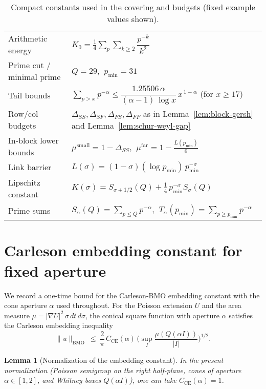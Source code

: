 \documentclass[11pt]{article}
\newtheorem{lemma}[theorem]{Lemma}
\theoremstyle{definition}
\theoremstyle{remark}
\begin{document}
\begin{table}[H]
\centering
\caption{Compact constants used in the covering and budgets (fixed example values shown).}
\begin{tabular}{l l}
\toprule
Arithmetic energy & $K_0=\tfrac14\sum_{p}\sum_{k\ge2} \dfrac{p^{-k}}{k^2}$ \\ 
Prime cut / minimal prime & $Q=29$, $\ p_{\min}=31$ \\ 
Tail bounds & $\sum_{p>x}p^{-\alpha} \le \dfrac{1.25506\,\alpha}{(\alpha-1)\,\log x}\,x^{\,1-\alpha}$ (for $x\ge 17$) \\ 
Row/col budgets & $\Delta_{SS},\Delta_{SF},\Delta_{FS},\Delta_{FF}$ as in Lemma~\ref{lem:block-gersh} and Lemma~\ref{lem:schur-weyl-gap} \\ 
In-block lower bounds & $\mu^{\mathrm{small}}=1-\Delta_{SS}$, $\ \mu^{\mathrm{far}}=1-\tfrac{L(p_{\min})}{6}$ \\ 
Link barrier & $L(\sigma)=(1-\sigma)(\log p_{\min})\,p_{\min}^{-\sigma}$ \\ 
Lipschitz constant & $K(\sigma)=S_{\sigma+1/2}(Q)+\tfrac14\,p_{\min}^{-\sigma}S_{\sigma}(Q)$ \\ 
Prime sums & $S_{\alpha}(Q)=\sum_{p\le Q} p^{-\alpha}$, $\ T_{\alpha}(p_{\min})=\sum_{p\ge p_{\min}} p^{-\alpha}$ \\ 
\bottomrule
\end{tabular}
\end{table}
\appendix
\section{Carleson embedding constant for fixed aperture}\label{app:CE-constant}
We record a one-time bound for the Carleson-BMO embedding constant with the cone aperture $\alpha$ used throughout. For the Poisson extension $U$ and the area measure $\mu=|\nabla U|^2\,\sigma\,dt\,d\sigma$, the conical square function with aperture $\alpha$ satisfies the Carleson embedding inequality
\[
  \|u\|_{\mathrm{BMO}}\ \le\ \frac{2}{\pi}\,C_{\mathrm{CE}}(\alpha)\,\Big(\sup_I \frac{\mu(Q(\alpha I))}{|I|}\Big)^{\!1/2}.
\]
\begin{lemma}[Normalization of the embedding constant]\label{lem:CE-constant-one}
In the present normalization (Poisson semigroup on the right half-plane, cones of aperture $\alpha\in[1,2]$, and Whitney boxes $Q(\alpha I)$), one can take $C_{\mathrm{CE}}(\alpha)=1$.
\end{lemma}
\end{document}
